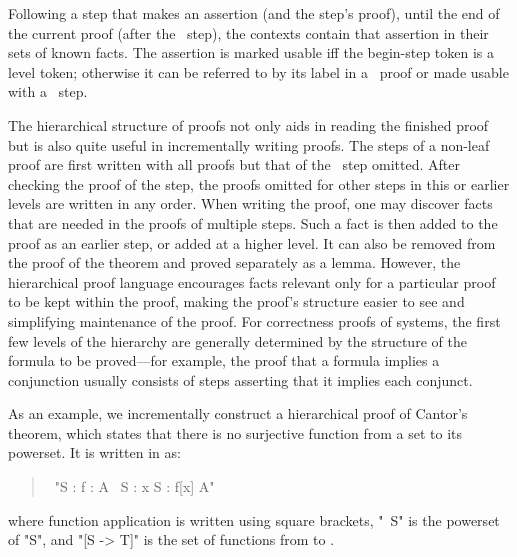 \documentclass[a4paper]{easychair}
\begin{document}
Following a step that makes an assertion (and the step's proof), until
the end of the current proof (after the \QED\ step), the contexts
contain that assertion in their sets of known facts.  The assertion is
marked usable iff the begin-step token is a level token; otherwise it
can be referred to by its label in a \BY\ proof or made usable with
a \USE\ step.

The hierarchical structure of proofs not only aids in reading the finished
proof but is also quite useful in incrementally writing proofs.  The
steps of a non-leaf proof are first written with all proofs but that
of the \QED\ step omitted.  After checking the proof of the \QED
step, the proofs omitted for other steps in this or earlier levels
are written in any order.  When writing the proof, one may discover
facts that are needed in the proofs of multiple steps.
Such a fact is then added to the proof as an earlier step, or added at a
higher level.  It can also be removed from the proof of the theorem
and proved separately as a lemma.  However, the hierarchical proof
language encourages facts relevant only for a particular proof to be
kept within the proof, making the proof's structure easier to see and
simplifying maintenance of the proof.  For correctness proofs of
systems, the first few levels of the hierarchy are generally
determined by the structure of the formula to be proved---for example,
the proof that a formula implies a conjunction usually consists of steps
asserting that it implies each conjunct.

As an example, we incrementally construct a hierarchical proof of
Cantor's theorem, which states that there is no surjective function
from a set to its powerset. It is written in \tlaplus as:
\begin{quote} \small
  \begin{tabbing}
    \THEOREM\ "\forall S : \forall f \in [S -> \SUBSET\ S] : 
        \exists A \in \SUBSET\ S : \forall x \in S : f[x] \neq A"
  \end{tabbing}
\end{quote}
where function application is written using square brackets,
"\SUBSET\ S" is the powerset of "S", and "[S -> T]" is the set of
functions from  to .
\end{document}
